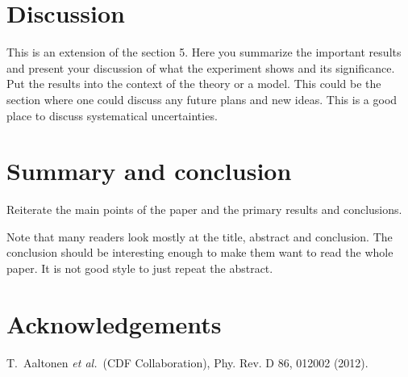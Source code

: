 \documentclass[11pt,a4paper]{advlabnote}
\begin{document}
\section{Discussion}
This is an extension of the section 5. Here you summarize the important results
and present your discussion of what the experiment shows and its significance.
Put the results into the context of the theory or a model.
This could be the section where one could discuss any future plans and new ideas.
This is a good place to discuss systematical uncertainties. 


%
%
\section{Summary and conclusion}

Reiterate the main points of the paper and the primary results and
conclusions.

Note that many readers look mostly at the title, abstract and
conclusion. The conclusion should be interesting enough to
make them want to read the whole paper.
It is not good style to just repeat the abstract.


%
%
\section{Acknowledgements}
%
\begin{thebibliography}{99}
T.~Aaltonen {\it et al.}~(CDF Collaboration), Phy. Rev. D 86, 012002 (2012).
\end{thebibliography}
%
\end{document}
